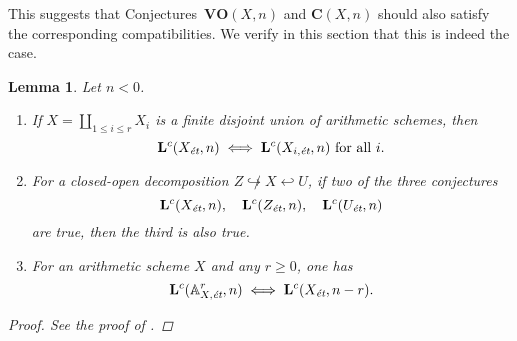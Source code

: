 \documentclass[10pt,a4paper,oneside]{article}
\renewcommand{\AA}{\mathbb{A}}
\newcommand{\et}{\text{\it \'{e}t}}
\theoremstyle{myplain}
\newtheorem{lemma}[theorem]{Lemma}
\theoremstyle{mydefinition}
\numberwithin{equation}{section}
\begin{document}
This suggests that Conjectures~$\mathbf{VO} (X,n)$ and $\mathbf{C} (X,n)$ should
also satisfy the corresponding compatibilities. We verify in this section that
this is indeed the case.

\begin{lemma}
  \label{lemma:compatibility-of-Lc(X,n)}
  Let $n < 0$.

  \begin{enumerate}
  \item[1)] If $X = \coprod_{1 \le i \le r} X_i$ is a finite disjoint union of
    arithmetic schemes, then
    $$\mathbf{L}^c (X_\et,n) \iff \mathbf{L}^c (X_{i,\et},n)\text{ for all }i.$$

  \item[2)] For a closed-open decomposition
    $Z \not\hookrightarrow X \hookleftarrow U$, if two of the three conjectures
    \[ \mathbf{L}^c (X_\et,n), \quad
      \mathbf{L}^c (Z_\et,n), \quad
      \mathbf{L}^c (U_\et, n) \]
    are true, then the third is also true.

  \item[3)] For an arithmetic scheme $X$ and any $r \ge 0$, one has
    $$\mathbf{L}^c (\AA^r_{X,\et}, n) \iff \mathbf{L}^c (X_\et, n-r).$$
  \end{enumerate}

  \begin{proof}
    See the proof of \cite[Proposition~5.10]{Morin-2014}.
  \end{proof}
\end{lemma}
\end{document}
